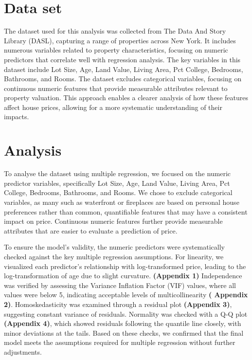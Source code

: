 \documentclass[
  twocolumn]{article}
\begin{document}
\section{Data set}\label{data-set}

The dataset used for this analysis was collected from The Data And Story
Library (DASL), capturing a range of properties across New York. It
includes numerous variables related to property characteristics,
focusing on numeric predictors that correlate well with regression
analysis. The key variables in this dataset include Lot Size, Age, Land
Value, Living Area, Pct College, Bedrooms, Bathrooms, and Rooms. The
dataset excludes categorical variables, focusing on continuous numeric
features that provide measurable attributes relevant to property
valuation. This approach enables a clearer analysis of how these
features affect house prices, allowing for a more systematic
understanding of their impacts.

\section{Analysis}\label{analysis}

To analyse the dataset using multiple regression, we focused on the
numeric predictor variables, specifically Lot Size, Age, Land Value,
Living Area, Pct College, Bedrooms, Bathrooms, and Rooms. We chose to
exclude categorical variables, as many such as waterfront or fireplaces
are based on personal house preferences rather than common, quantifiable
features that may have a consistent impact on price. Continuous numeric
features further provide measurable attributes that are easier to
evaluate a prediction of price.

To ensure the model's validity, the numeric predictors were
systematically checked against the key multiple regression assumptions.
For linearity, we visualized each predictor's relationship with
log-transformed price, leading to the log-transformation of age due to
slight curvature. \textbf{(Appendix 1)} Independence was verified by
assessing the Variance Inflation Factor (VIF) values, where all values
were below 5, indicating acceptable levels of multicollinearity
\textbf{( Appendix 2)}. Homoskedasticity was examined through a residual
plot \textbf{(Appendix 3)}, suggesting constant variance of residuals.
Normality was checked with a Q-Q plot \textbf{(Appendix 4)}, which
showed residuals following the quantile line closely, with minor
deviations at the tails. Based on these checks, we confirmed that the
final model meets the assumptions required for multiple regression
without further adjustments.
\end{document}
